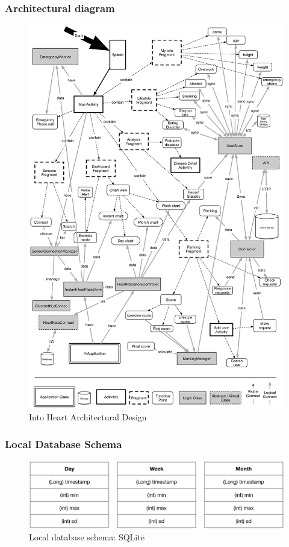 \subsubsection{Architectural diagram}
\begin{figure}[H]
\centering
\includegraphics[width=5.2in]{img/arch.eps}
\caption{Into Heart Architectural Design}
\end{figure}

\subsubsection{Local Database Schema}
\begin{figure}[H]
\centering
\includegraphics[width=5.3in]{img/local_schema.eps}
\caption{Local database schema: SQLite}
\end{figure}

